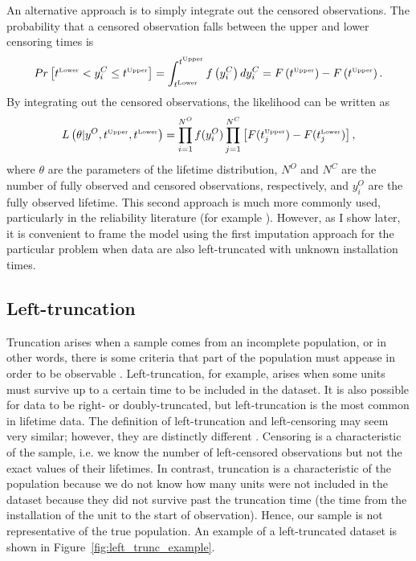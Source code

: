 An alternative approach is to simply integrate out the censored observations. The probability that a censored observation falls between the upper and lower censoring times is
\begin{equation}
    \label{eq:integrate-out-cens}
    Pr\left[t^{\hbox{\tiny{Lower}}} < y^C_i \leq t^{\hbox{\tiny{Upper}}}\right] = \int_{t^{\hbox{\tiny{Lower}}}}^{t^{\hbox{\tiny{Upper}}}} f\left(y^C_i\right) d y^C_i = F\left(t^{\hbox{\tiny{Upper}}}\right) - F\left(t^{\hbox{\tiny{Upper}}}\right).
\end{equation}
By integrating out the censored observations, the likelihood can be written as
\begin{equation}
    \label{eq:censored_likelihood}
    L\left(\theta|y^O, t^{\hbox{\tiny{Upper}}}, t^{\hbox{\tiny{Lower}}}\right) = \prod^{N^O}_{i = 1}f(y^O_i) \prod^{N^C}_{j = 1}\left[F(t^{\hbox{\tiny{Upper}}}_j) - F(t^{\hbox{\tiny{Lower}}}_j)\right],
\end{equation}
where $\theta$ are the parameters of the lifetime distribution, $N^O$ and $N^C$ are the number of fully observed and censored observations, respectively, and $y^O_i$ are the fully observed lifetime. This second approach is much more commonly used, particularly in the reliability literature (for example \citet{Meeker2022,tian2024,hong2009,mittman2013}). However, as I show later, it is convenient to frame the model using the first imputation approach for the particular problem when data are also left-truncated with unknown installation times.

\subsection{Left-truncation}

Truncation arises when a sample comes from an incomplete population, or in other words, there is some criteria that part of the population must appease in order to be observable \citep{guo1993}. Left-truncation, for example, arises when some units must survive up to a certain time to be included in the dataset. It is also possible for data to be right- or doubly-truncated, but left-truncation is the most common in lifetime data. The definition of left-truncation and left-censoring may seem very similar; however, they are distinctly different \citep{mitra2013}. Censoring is a characteristic of the sample, i.e. we know the number of left-censored observations but not the exact values of their lifetimes. In contrast, truncation is a characteristic of the population because we do not know how many units were not included in the dataset because they did not survive past the truncation time (the time from the installation of the unit to the start of observation). Hence, our sample is not representative of the true population. An example of a left-truncated dataset is shown in Figure~\ref{fig:left_trunc_example}.

